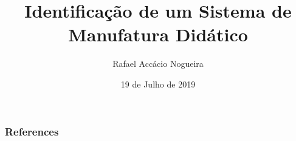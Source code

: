 \documentclass[xcolor=x11names]{beamer}
\author{Rafael Accácio Nogueira}
\title{Identificação de um Sistema de Manufatura Didático}
\institute{Email: raccacio@poli.ufrj.br}
\date{19 de Julho de 2019}
\begin{document}

% 









\appendix
\begin{frame}[allowframebreaks] %

\frametitle{References}

\scriptsize{}

\nocite{moreira2013bridging}

\end{frame}
\end{document}
